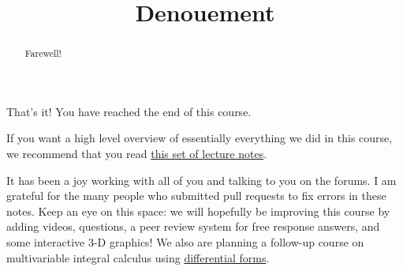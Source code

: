 \documentclass{ximera}
\title{Denouement}
\begin{document}
	\begin{abstract}
		Farewell!
	\end{abstract}
	
	That's it!  You have reached the end of this course.
	
	If you want a high level overview of essentially everything we
        did in this course, we recommend that you read
        \href{http://math.caltech.edu/~ma108a/notesderivatice.pdf}{this
          set of lecture notes}.
	
	It has been a joy working with all of you and talking to you
        on the forums.  I am grateful for the many people who
        submitted pull requests to fix errors in these notes.  Keep an
        eye on this space: we will hopefully be improving this course
        by adding videos, questions, a peer review system for free
        response answers, and some interactive 3-D graphics!  We also
        are planning a follow-up course on multivariable integral
        calculus using
        \href{http://en.wikipedia.org/wiki/Differential_form}{differential
          forms}.
\end{document}
